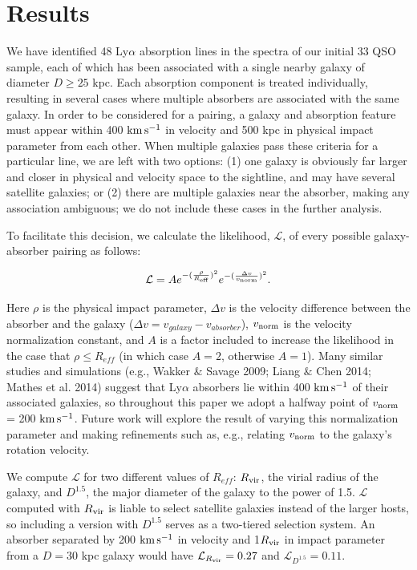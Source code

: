 \section{Results}

We have identified 48 Ly$\alpha$ absorption lines in the spectra of our initial 33 QSO sample, each of which has been associated with a single nearby galaxy of diameter $D\geq25$ kpc. Each absorption component is treated individually, resulting in several cases where multiple absorbers are associated with the same galaxy. In order to be considered for a pairing, a galaxy and absorption feature must appear within 400 $\rm km\, s^{-1}$ in velocity and 500 kpc in physical impact parameter from each other. When multiple galaxies pass these criteria for a particular line, we are left with two options: (1) one galaxy is obviously far larger and closer in physical and velocity space to the sightline, and may have several satellite galaxies; or (2) there are multiple galaxies near the absorber, making any association ambiguous; we do not include these cases in the further analysis.

To facilitate this decision, we calculate the likelihood, $\mathcal{L}$, of every possible galaxy-absorber pairing as follows:

\begin{equation}
	\mathcal{L} = A e^{-(\frac{\rho}{R_{\rm eff}})^2} e^{-(\frac{\Delta v}{v_{\rm norm}})^2}.
\end{equation}

\noindent Here $\rho$ is the physical impact parameter, $\Delta v$ is the velocity difference between the absorber and the galaxy ($\Delta v = v_{galaxy} - v_{absorber}$), $v_{\rm norm}$ is the velocity normalization constant, and $A$ is a factor included to increase the likelihood in the case that $\rho \leq R_{eff}$ (in which case $A = 2$, otherwise $A = 1$). Many similar studies and simulations (e.g., Wakker $\&$ Savage 2009; Liang $\&$ Chen 2014; Mathes et al. 2014) suggest that Ly$\alpha$ absorbers lie within 400 $\rm km\, s^{-1}$ of their associated galaxies, so throughout this paper we adopt a halfway point of $v_{\rm norm}$ = 200 $\rm km\, s^{-1}$. Future work will explore the result of varying this normalization parameter and making refinements such as, e.g., relating $v_{\rm norm}$ to the galaxy's rotation velocity.

We compute $\mathcal{L}$ for two different values of $R_{eff}$: $R_{\rm vir}$, the virial radius of the galaxy, and $D^{1.5}$, the major diameter of the galaxy to the power of 1.5. $\mathcal{L}$ computed with $R_{\rm vir}$ is liable to select satellite galaxies instead of the larger hosts, so including a version with $D^{1.5}$ serves as a two-tiered selection system. An absorber separated by 200 $\rm km\, s^{-1}$ in velocity and 1$R_{\rm vir}$ in impact parameter from a $D=30$ kpc galaxy would have $\mathcal{L}_{R_{\rm vir}} = 0.27$ and $\mathcal{L}_{D^{1.5}} = 0.11$.

